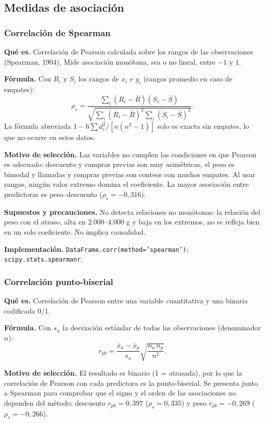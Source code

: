 \documentclass[10pt,a4paper]{article}
\begin{document}
\subsection{Medidas de asociación}

\subsubsection{Correlación de Spearman}
\textbf{Qué es.} Correlación de Pearson calculada sobre los rangos de las observaciones (Spearman, 1904). Mide asociación monótona, sea o no lineal, entre $-1$ y $1$.

\textbf{Fórmula.} Con $R_i$ y $S_i$ los rangos de $x_i$ e $y_i$ (rangos promedio en caso de empates):
\[
\rho_s=\frac{\sum_i(R_i-\bar R)(S_i-\bar S)}{\sqrt{\sum_i(R_i-\bar R)^2\sum_i(S_i-\bar S)^2}}.
\]
La fórmula abreviada $1-6\sum d_i^2/[n(n^2-1)]$ solo es exacta sin empates, lo que no ocurre en estos datos.

\textbf{Motivo de selección.} Las variables no cumplen las condiciones en que Pearson es adecuado: descuento y compras previas son muy asimétricas, el peso es bimodal y llamadas y compras previas son conteos con muchos empates. Al usar rangos, ningún valor extremo domina el coeficiente. La mayor asociación entre predictoras es peso--descuento ($\rho_s=-0{,}316$).

\textbf{Supuestos y precauciones.} No detecta relaciones no monótonas: la relación del peso con el atraso, alta en 2.000--4.000 g y baja en los extremos, no se refleja bien en un solo coeficiente. No implica causalidad.

\textbf{Implementación.} \texttt{DataFrame.corr(method='spearman')}; \texttt{scipy.stats.spearmanr}.

\subsubsection{Correlación punto-biserial}
\textbf{Qué es.} Correlación de Pearson entre una variable cuantitativa y una binaria codificada 0/1.

\textbf{Fórmula.} Con $s_n$ la desviación estándar de todas las observaciones (denominador $n$):
\[
r_{pb}=\frac{\bar x_a-\bar x_p}{s_n}\sqrt{\frac{n_a\,n_p}{n^2}}.
\]

\textbf{Motivo de selección.} El resultado es binario (1 = atrasada), por lo que la correlación de Pearson con cada predictora es la punto-biserial. Se presenta junto a Spearman para comprobar que el signo y el orden de las asociaciones no dependen del método: descuento $r_{pb}=0{,}397$ ($\rho_s=0{,}335$) y peso $r_{pb}=-0{,}269$ ($\rho_s=-0{,}266$).
\end{document}
